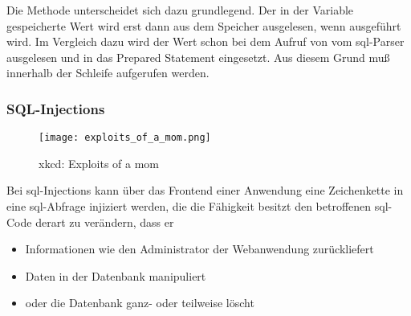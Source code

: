 Die Methode  unterscheidet sich dazu grundlegend. Der in der Variable gespeicherte Wert wird erst dann aus dem Speicher ausgelesen, wenn  ausgeführt wird. Im Vergleich dazu wird der Wert schon bei dem Aufruf von  vom \gls{sql}-Parser ausgelesen und in das Prepared Statement eingesetzt. Aus diesem Grund muß  innerhalb der Schleife aufgerufen werden.

\begin{listing}[H]
\label{lst:insertBindParam}
\end{listing}

\newpage

\subsubsection{SQL-Injections}
\label{basics:doctrine:subsubsec:sqlInjections}
\begin{figure}[H]
    \centering
    \texttt{[image: exploits\_of\_a\_mom.png]}
    \caption{xkcd: Exploits of a mom\footnotemark}
    \label{fig:littleBobbyTables}
\end{figure}
Bei \gls{sql}-Injections kann über das Frontend einer Anwendung eine Zeichenkette in eine \gls{sql}-Abfrage injiziert werden, die die Fähigkeit besitzt den betroffenen \gls{sql}-Code derart zu verändern, dass er

\begin{itemize}
	\item Informationen wie den Administrator der Webanwendung zurückliefert
	\item Daten in der Datenbank manipuliert
	\item oder die Datenbank ganz- oder teilweise löscht
\end{itemize}

